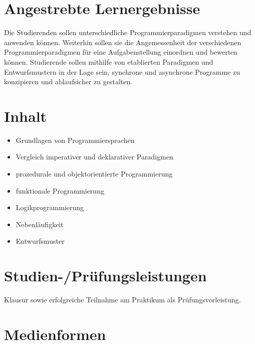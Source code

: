 \section*{Angestrebte
Lernergebnisse\label{/mi-2017/modulbeschreibungen-bachelor/BA_Paradigmen-der-Programmierung}}\label{angestrebte-lernergebnissepathlabelmi-2017modulbeschreibungen-bachelorbaux5fparadigmen-der-programmierung}

Die Studierenden sollen unterschiedliche Programmierparadigmen verstehen
und anwenden können. Weiterhin sollen sie die Angemessenheit der
verschiedenen Programmierparadigmen für eine Aufgabenstellung einordnen
und bewerten können. Studierende sollen mithilfe von etablierten
Paradigmen und Entwurfsmustern in der Lage sein, synchrone und
asynchrone Programme zu konzipieren und ablaufsicher zu gestalten.

\section*{Inhalt\label{/mi-2017/modulbeschreibungen-bachelor/BA_Paradigmen-der-Programmierung}}\label{inhaltpathlabelmi-2017modulbeschreibungen-bachelorbaux5fparadigmen-der-programmierung}

\begin{itemize}
\tightlist
\item
  Grundlagen von Programmiersprachen
\item
  Vergleich imperativer und deklarativer Paradigmen
\item
  prozedurale und objektorientierte Programmierung
\item
  funktionale Programmierung
\item
  Logikprogrammierung
\item
  Nebenläufigkeit
\item
  Entwurfsmuster
\end{itemize}

\section*{Studien-/Prüfungsleistungen\label{/mi-2017/modulbeschreibungen-bachelor/BA_Paradigmen-der-Programmierung}}\label{studien-pruxfcfungsleistungenpathlabelmi-2017modulbeschreibungen-bachelorbaux5fparadigmen-der-programmierung}

Klausur sowie erfolgreiche Teilnahme am Praktikum als
Prüfungsvorleistung.

\section*{Medienformen\label{/mi-2017/modulbeschreibungen-bachelor/BA_Paradigmen-der-Programmierung}}\label{medienformenpathlabelmi-2017modulbeschreibungen-bachelorbaux5fparadigmen-der-programmierung}

